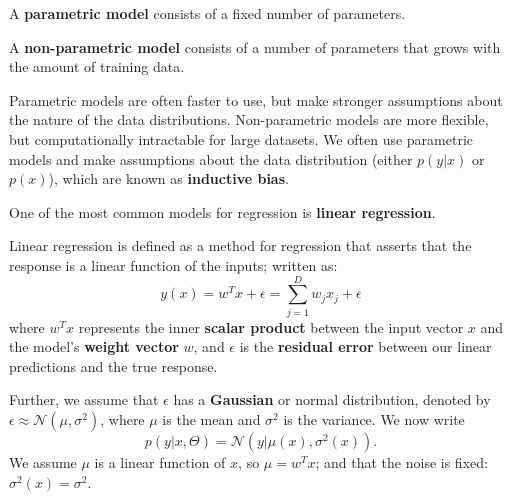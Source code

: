 \begin{definition}
	A \textbf{parametric model} consists of a fixed number of parameters.
\end{definition}
\begin{definition}
	A \textbf{non-parametric model} consists of a number of parameters that grows with the amount of training data.
\end{definition}

Parametric models are often faster to use, but make stronger assumptions about the nature of the data distributions. Non-parametric models are more flexible, but computationally intractable for large datasets. We often use parametric models and make assumptions about the data distribution (either \(p(y|x)\) or \(p(x)\)), which are known as \textbf{inductive bias}. \par

One of the most common models for regression is \textbf{linear regression}.

\begin{definition}
	Linear regression is defined as a method for regression that asserts that the response is a linear function of the inputs; written as:
	\[
		y(x)=w^Tx+\epsilon = \sum_{j=1}^D w_j x_j + \epsilon  
	\]
	where \(w^Tx\) represents the inner \textbf{scalar product} between the input vector \(x\) and the model's \textbf{weight vector} \(w\), and \(\epsilon \) is the \textbf{residual error} between our linear predictions and the true response.
\end{definition}

Further, we assume that \(\epsilon\) has a \textbf{Gaussian} or normal distribution, denoted by \(\epsilon \approx \mathcal{N} (\mu ,\sigma ^2)\), where \(\mu\) is the mean and \(\sigma ^2\) is the variance. We now write
\[
	p(y|x,\Theta)=\mathcal{N} (y|\mu (x), \sigma ^2(x)).
\]
We assume \(\mu\) is a linear function of \(x\), so \(\mu =w^Tx\); and that the noise is fixed: \(\sigma ^2(x)=\sigma ^2\).